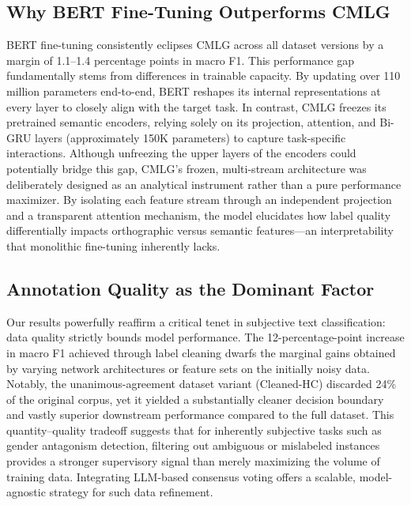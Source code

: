 ﻿\documentclass[12pt]{article}
\begin{document}
\subsection{Why BERT Fine-Tuning Outperforms CMLG}
BERT fine-tuning consistently eclipses CMLG across all dataset versions by a margin of 1.1--1.4 percentage points in macro F1. This performance gap fundamentally stems from differences in trainable capacity. By updating over 110 million parameters end-to-end, BERT reshapes its internal representations at every layer to closely align with the target task. In contrast, CMLG freezes its pretrained semantic encoders, relying solely on its projection, attention, and Bi-GRU layers (approximately 150K parameters) to capture task-specific interactions. Although unfreezing the upper layers of the encoders could potentially bridge this gap, CMLG's frozen, multi-stream architecture was deliberately designed as an analytical instrument rather than a pure performance maximizer. By isolating each feature stream through an independent projection and a transparent attention mechanism, the model elucidates how label quality differentially impacts orthographic versus semantic features—an interpretability that monolithic fine-tuning inherently lacks.

\subsection{Annotation Quality as the Dominant Factor}
Our results powerfully reaffirm a critical tenet in subjective text classification: data quality strictly bounds model performance. The 12-percentage-point increase in macro F1 achieved through label cleaning dwarfs the marginal gains obtained by varying network architectures or feature sets on the initially noisy data. Notably, the unanimous-agreement dataset variant (Cleaned-HC) discarded 24\% of the original corpus, yet it yielded a substantially cleaner decision boundary and vastly superior downstream performance compared to the full dataset. This quantity--quality tradeoff suggests that for inherently subjective tasks such as gender antagonism detection, filtering out ambiguous or mislabeled instances provides a stronger supervisory signal than merely maximizing the volume of training data. Integrating LLM-based consensus voting offers a scalable, model-agnostic strategy for such data refinement.
\end{document}
